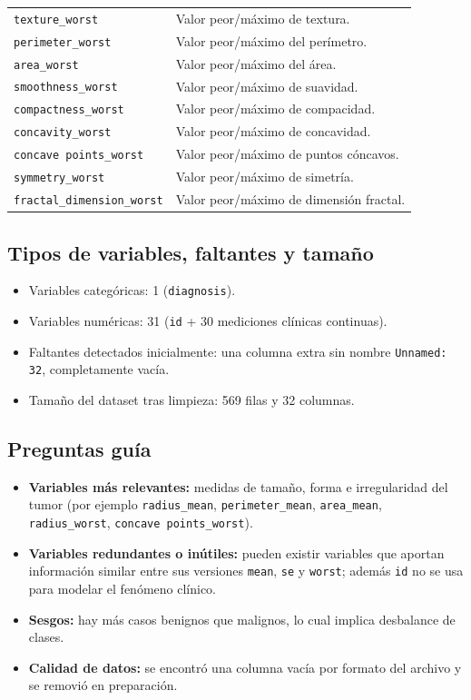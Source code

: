 \documentclass[12pt]{article}
\begin{document}
\begin{longtable}{p{} p{}}
\texttt{texture\_worst} & Valor peor/máximo de textura. \\
\texttt{perimeter\_worst} & Valor peor/máximo del perímetro. \\
\texttt{area\_worst} & Valor peor/máximo del área. \\
\texttt{smoothness\_worst} & Valor peor/máximo de suavidad. \\
\texttt{compactness\_worst} & Valor peor/máximo de compacidad. \\
\texttt{concavity\_worst} & Valor peor/máximo de concavidad. \\
\texttt{concave points\_worst} & Valor peor/máximo de puntos cóncavos. \\
\texttt{symmetry\_worst} & Valor peor/máximo de simetría. \\
\texttt{fractal\_dimension\_worst} & Valor peor/máximo de dimensión fractal. \\
\bottomrule
\end{longtable}

\subsection{Tipos de variables, faltantes y tamaño}
\begin{itemize}
    \item Variables categóricas: 1 (\texttt{diagnosis}).
    \item Variables numéricas: 31 (\texttt{id} + 30 mediciones clínicas continuas).
    \item Faltantes detectados inicialmente: una columna extra sin nombre \texttt{Unnamed: 32}, completamente vacía.
    \item Tamaño del dataset tras limpieza: 569 filas y 32 columnas.
\end{itemize}

\subsection{Preguntas guía}
\begin{itemize}
    \item \textbf{Variables más relevantes:} medidas de tamaño, forma e irregularidad del tumor (por ejemplo \texttt{radius\_mean}, \texttt{perimeter\_mean}, \texttt{area\_mean}, \texttt{radius\_worst}, \texttt{concave points\_worst}).
    \item \textbf{Variables redundantes o inútiles:} pueden existir variables que aportan información similar entre sus versiones \texttt{mean}, \texttt{se} y \texttt{worst}; además \texttt{id} no se usa para modelar el fenómeno clínico.
    \item \textbf{Sesgos:} hay más casos benignos que malignos, lo cual implica desbalance de clases.
    \item \textbf{Calidad de datos:} se encontró una columna vacía por formato del archivo y se removió en preparación.
\end{itemize}
\end{document}
